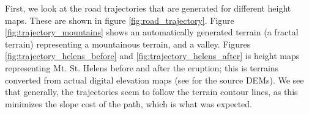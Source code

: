 First, we look at the road trajectories that are generated for different height maps. These are shown in figure \ref{fig:road_trajectory}. Figure \ref{fig:trajectory_mountains} shows an automatically generated terrain (a fractal terrain) representing a mountainous terrain, and a valley. Figures \ref{fig:trajectory_helens_before} and \ref{fig:trajectory_helens_after} is height maps representing Mt. St. Helens before and after the eruption; this is terrains converted from actual digital elevation maps (see \cite{helens_dem} for the source DEMs). We see that generally, the trajectories seem to follow the terrain contour lines, as this minimizes the slope cost of the path, which is what was expected. 

\begin{figure}[H]
\centering
{}\\
\quad

\end{figure}
